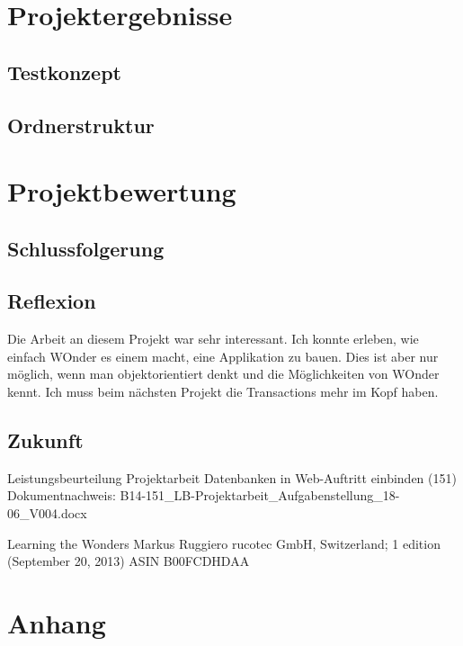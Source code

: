 \documentclass[a4paper, 11pt]{article}
\begin{document}
\section{Projektergebnisse}

\subsection{Testkonzept}

\subsection{Ordnerstruktur}

\section{Projektbewertung}

\subsection{Schlussfolgerung}

\subsection{Reflexion}

Die Arbeit an diesem Projekt war sehr interessant.
Ich konnte erleben, wie einfach WOnder es einem macht, eine Applikation zu bauen.
Dies ist aber nur möglich, wenn man objektorientiert denkt und die Möglichkeiten von WOnder kennt.
Ich muss beim nächsten Projekt die Transactions mehr im Kopf haben.

\subsection{Zukunft}

\begin{thebibliography}{9}
Leistungsbeurteilung Projektarbeit
Datenbanken in Web-Auftritt einbinden (151)
Dokumentnachweis: B14-151\_LB-Projektarbeit\_Aufgabenstellung\_18-06\_V004.docx

Learning the Wonders
Markus Ruggiero
rucotec GmbH, Switzerland; 1 edition (September 20, 2013)
ASIN B00FCDHDAA

\end{thebibliography}

\section{Anhang}
\end{document}
